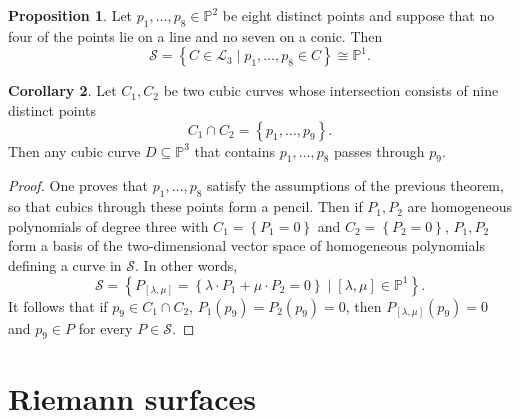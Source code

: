 \documentclass{article}
\renewcommand{\P}{\mathbb{P}}
\newcommand{\rb}[1]{\left( #1 \right)}
\renewcommand{\sb}[1]{\left[ #1 \right]}
\newcommand{\cb}[1]{\left\{ #1 \right\}}
\theoremstyle{definition}\newtheorem{definition}{Definition}[section]
\theoremstyle{definition}\newtheorem{notation}[definition]{Notation}
\theoremstyle{definition}\newtheorem{remark}[definition]{Remark}
\theoremstyle{definition}\newtheorem{example}[definition]{Example}
\theoremstyle{definition}\newtheorem{fact}{Fact}
\theoremstyle{definition}\newtheorem{exercise}{Exercise}
\newtheorem{proposition}[definition]{Proposition}
\newtheorem{corollary}[definition]{Corollary}
\begin{document}
\begin{proposition}
Let $ p_1, \dots, p_8 \in \P^2 $ be eight distinct points and suppose that no four of the points lie on a line and no seven on a conic. Then
$$ \mathcal{S} = \cb{C \in \mathcal{L}_3 \mid p_1, \dots, p_8 \in C} \cong \P^1. $$
\end{proposition}

\begin{corollary}
Let $ C_1, C_2 $ be two cubic curves whose intersection consists of nine distinct points
$$ C_1 \cap C_2 = \cb{p_1, \dots, p_9}. $$
Then any cubic curve $ D \subseteq \P^3 $ that contains $ p_1, \dots, p_8 $ passes through $ p_9 $.
\end{corollary}

\begin{proof}
One proves that $ p_1, \dots, p_8 $ satisfy the assumptions of the previous theorem, so that cubics through these points form a pencil. Then if $ P_1, P_2 $ are homogeneous polynomials of degree three with $ C_1 = \cb{P_1 = 0} $ and $ C_2 = \cb{P_2 = 0} $, $ P_1, P_2 $ form a basis of the two-dimensional vector space of homogeneous polynomials defining a curve in $ \mathcal{S} $. In other words,
$$ \mathcal{S} = \cb{P_{\sb{\lambda, \mu}} = \cb{\lambda \cdot P_1 + \mu \cdot P_2 = 0} \mid \sb{\lambda, \mu} \in \P^1}. $$
It follows that if $ p_9 \in C_1 \cap C_2 $, $ P_1\rb{p_9} = P_2\rb{p_9} = 0 $, then $ P_{\sb{\lambda, \mu}}\rb{p_9} = 0 $ and $ p_9 \in P $ for every $ P \in \mathcal{S} $.
\end{proof}

\section{Riemann surfaces}
\end{document}
